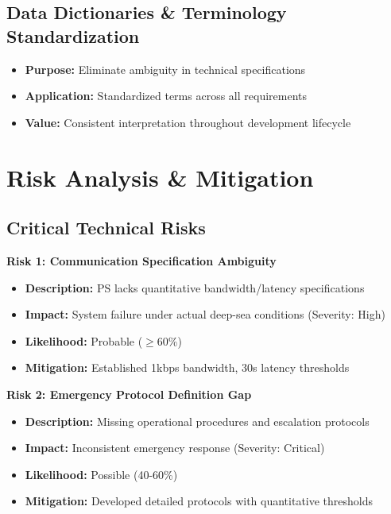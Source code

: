 \documentclass[12pt,a4paper]{article}
\begin{document}
\subsection{Data Dictionaries \& Terminology Standardization}
\begin{itemize}
\item \textbf{Purpose:} Eliminate ambiguity in technical specifications
\item \textbf{Application:} Standardized terms across all requirements
\item \textbf{Value:} Consistent interpretation throughout development lifecycle
\end{itemize}

\newpage

\section{Risk Analysis \& Mitigation}
\label{sec:risks}

\subsection{Critical Technical Risks}

\textbf{Risk 1: Communication Specification Ambiguity}
\begin{itemize}
\item \textbf{Description:} PS lacks quantitative bandwidth/latency specifications
\item \textbf{Impact:} System failure under actual deep-sea conditions (Severity: High)
\item \textbf{Likelihood:} Probable ($\geq$60\%) 
\item \textbf{Mitigation:} Established 1kbps bandwidth, 30s latency thresholds
\end{itemize}

\textbf{Risk 2: Emergency Protocol Definition Gap}
\begin{itemize}
\item \textbf{Description:} Missing operational procedures and escalation protocols
\item \textbf{Impact:} Inconsistent emergency response (Severity: Critical)
\item \textbf{Likelihood:} Possible (40-60\%)
\item \textbf{Mitigation:} Developed detailed protocols with quantitative thresholds
\end{itemize}
\end{document}

